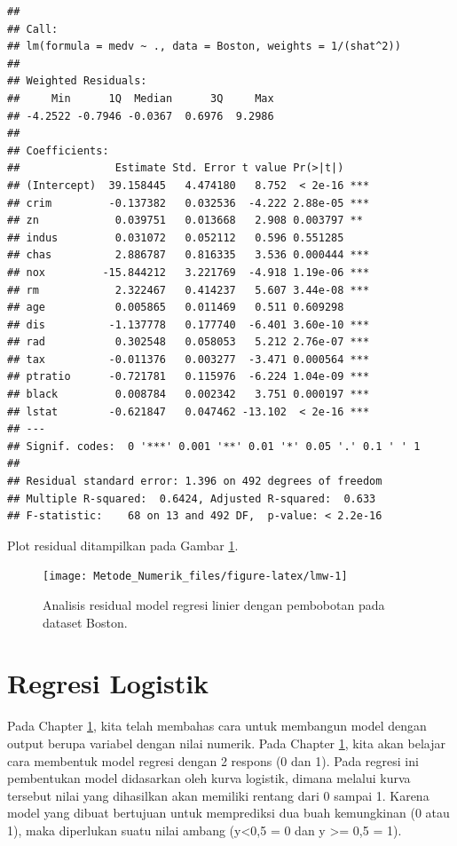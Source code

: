 \documentclass[]{book}
\theoremstyle{definition}
\theoremstyle{definition}
\theoremstyle{definition}
\theoremstyle{remark}
\begin{document}
\begin{verbatim}
## 
## Call:
## lm(formula = medv ~ ., data = Boston, weights = 1/(shat^2))
## 
## Weighted Residuals:
##     Min      1Q  Median      3Q     Max 
## -4.2522 -0.7946 -0.0367  0.6976  9.2986 
## 
## Coefficients:
##               Estimate Std. Error t value Pr(>|t|)    
## (Intercept)  39.158445   4.474180   8.752  < 2e-16 ***
## crim         -0.137382   0.032536  -4.222 2.88e-05 ***
## zn            0.039751   0.013668   2.908 0.003797 ** 
## indus         0.031072   0.052112   0.596 0.551285    
## chas          2.886787   0.816335   3.536 0.000444 ***
## nox         -15.844212   3.221769  -4.918 1.19e-06 ***
## rm            2.322467   0.414237   5.607 3.44e-08 ***
## age           0.005865   0.011469   0.511 0.609298    
## dis          -1.137778   0.177740  -6.401 3.60e-10 ***
## rad           0.302548   0.058053   5.212 2.76e-07 ***
## tax          -0.011376   0.003277  -3.471 0.000564 ***
## ptratio      -0.721781   0.115976  -6.224 1.04e-09 ***
## black         0.008784   0.002342   3.751 0.000197 ***
## lstat        -0.621847   0.047462 -13.102  < 2e-16 ***
## ---
## Signif. codes:  0 '***' 0.001 '**' 0.01 '*' 0.05 '.' 0.1 ' ' 1
## 
## Residual standard error: 1.396 on 492 degrees of freedom
## Multiple R-squared:  0.6424, Adjusted R-squared:  0.633 
## F-statistic:    68 on 13 and 492 DF,  p-value: < 2.2e-16
\end{verbatim}

Plot residual ditampilkan pada Gambar \ref{fig:lmw}.

\begin{figure}

{\centering \texttt{[image: Metode\_Numerik\_files/figure-latex/lmw-1]} 

}

\caption{Analisis residual model regresi linier dengan pembobotan pada dataset Boston.}\label{fig:lmw}
\end{figure}

\hypertarget{logreg}{%
\section{Regresi Logistik}\label{logreg}}

Pada Chapter \ref{logreg}, kita telah membahas cara untuk membangun model dengan output berupa variabel dengan nilai numerik. Pada Chapter \ref{logreg}, kita akan belajar cara membentuk model regresi dengan 2 respons (0 dan 1). Pada regresi ini pembentukan model didasarkan oleh kurva logistik, dimana melalui kurva tersebut nilai yang dihasilkan akan memiliki rentang dari 0 sampai 1. Karena model yang dibuat bertujuan untuk memprediksi dua buah kemungkinan (0 atau 1), maka diperlukan suatu nilai ambang (y\textless{}0,5 = 0 dan y \textgreater{}= 0,5 = 1).
\end{document}

